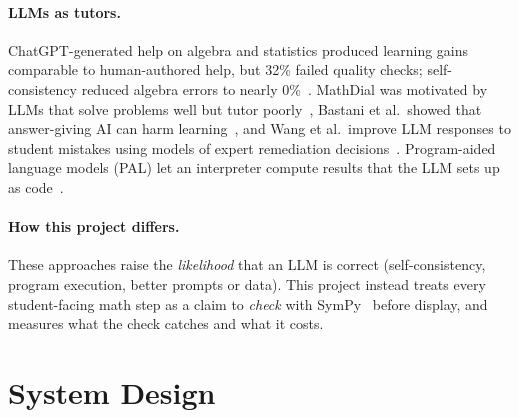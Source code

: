 \documentclass[11pt]{article}
\begin{document}
\paragraph{LLMs as tutors.} ChatGPT-generated help on algebra and statistics produced learning gains comparable to human-authored help, but 32\% failed quality checks; self-consistency reduced algebra errors to nearly 0\%~\cite{pardos2024chatgpt}. MathDial was motivated by LLMs that solve problems well but tutor poorly~\cite{macina2023mathdial}, Bastani et al.\ showed that answer-giving AI can harm learning~\cite{bastani2025harm}, and Wang et al.\ improve LLM responses to student mistakes using models of expert remediation decisions~\cite{wang2024bridge}. Program-aided language models (PAL) let an interpreter compute results that the LLM sets up as code~\cite{gao2023pal}.

\paragraph{How this project differs.} These approaches raise the \emph{likelihood} that an LLM is correct (self-consistency, program execution, better prompts or data). This project instead treats every student-facing math step as a claim to \emph{check} with SymPy~\cite{meurer2017sympy} before display, and measures what the check catches and what it costs.

\section{System Design}
\end{document}
